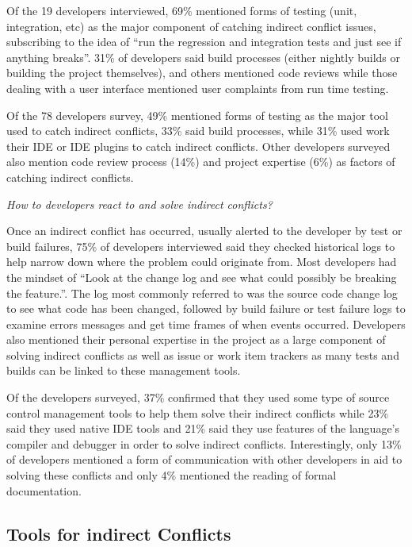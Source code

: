 \documentclass[conference]{IEEEtran}
\begin{document}
Of the 19 developers interviewed, 69\% mentioned forms of testing (unit, integration, etc) as the major component of catching indirect
conflict issues, subscribing to the idea of ``run the regression and integration tests and just see if anything breaks''. 31\% of developers 
said build processes (either nightly builds or building the project themselves), and others mentioned code reviews
while those dealing with a user interface mentioned user complaints from run time testing.

Of the 78 developers survey, 49\% mentioned forms of testing as the major tool used to catch indirect conflicts, 33\% said build processes,
while 31\% used work their IDE or IDE plugins to catch indirect conflicts. Other developers surveyed also mention code review process (14\%)
and project expertise (6\%) as factors of catching indirect conflicts.

\begin{description}[topsep=6pt]
	\item[RQ5] \textit{How to developers react to and solve indirect conflicts?}
\end{description}

Once an indirect conflict has occurred, usually alerted to the developer by test or build failures, 75\% of developers interviewed said
they checked historical logs to help narrow down where the problem could originate from. Most developers had the mindset of
``Look at the change log and see what could possibly be breaking the feature.''. The log most commonly referred to was the source
code change log to see what code has been changed, followed by build failure or test failure logs to examine errors messages and get time 
frames of when events occurred. Developers also mentioned their personal expertise in the project as a large component of solving indirect
conflicts as well as issue or work item trackers as many tests and builds can be linked to these management tools.

Of the developers surveyed, 37\% confirmed that they used some type of source control management tools to help them solve their indirect
conflicts while 23\% said they used native IDE tools and 21\% said they use features of the language's compiler and debugger in order
to solve indirect conflicts. Interestingly, only 13\% of developers mentioned a form of communication with other developers in aid to
solving these conflicts and only 4\% mentioned the reading of formal documentation.

\subsection{Tools for indirect Conflicts}
\end{document}
